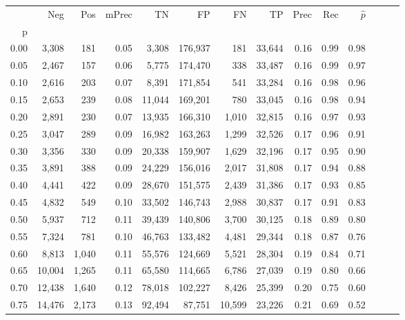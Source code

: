 \begin{tabular}{rrrrrrrrrrrrrr}
\toprule
{} &     Neg &    Pos & mPrec &       TN &       FP &      FN &      TP &  Prec &   Rec & $\hat{p}$ \\
p    &         &        &       &          &          &         &         &       &       &           \\
\midrule
0.00 &   3,308 &    181 &  0.05 &    3,308 &  176,937 &     181 &  33,644 &  0.16 &  0.99 &      0.98 \\
0.05 &   2,467 &    157 &  0.06 &    5,775 &  174,470 &     338 &  33,487 &  0.16 &  0.99 &      0.97 \\
0.10 &   2,616 &    203 &  0.07 &    8,391 &  171,854 &     541 &  33,284 &  0.16 &  0.98 &      0.96 \\
0.15 &   2,653 &    239 &  0.08 &   11,044 &  169,201 &     780 &  33,045 &  0.16 &  0.98 &      0.94 \\
0.20 &   2,891 &    230 &  0.07 &   13,935 &  166,310 &   1,010 &  32,815 &  0.16 &  0.97 &      0.93 \\
0.25 &   3,047 &    289 &  0.09 &   16,982 &  163,263 &   1,299 &  32,526 &  0.17 &  0.96 &      0.91 \\
0.30 &   3,356 &    330 &  0.09 &   20,338 &  159,907 &   1,629 &  32,196 &  0.17 &  0.95 &      0.90 \\
0.35 &   3,891 &    388 &  0.09 &   24,229 &  156,016 &   2,017 &  31,808 &  0.17 &  0.94 &      0.88 \\
0.40 &   4,441 &    422 &  0.09 &   28,670 &  151,575 &   2,439 &  31,386 &  0.17 &  0.93 &      0.85 \\
0.45 &   4,832 &    549 &  0.10 &   33,502 &  146,743 &   2,988 &  30,837 &  0.17 &  0.91 &      0.83 \\
0.50 &   5,937 &    712 &  0.11 &   39,439 &  140,806 &   3,700 &  30,125 &  0.18 &  0.89 &      0.80 \\
0.55 &   7,324 &    781 &  0.10 &   46,763 &  133,482 &   4,481 &  29,344 &  0.18 &  0.87 &      0.76 \\
0.60 &   8,813 &  1,040 &  0.11 &   55,576 &  124,669 &   5,521 &  28,304 &  0.19 &  0.84 &      0.71 \\
0.65 &  10,004 &  1,265 &  0.11 &   65,580 &  114,665 &   6,786 &  27,039 &  0.19 &  0.80 &      0.66 \\
0.70 &  12,438 &  1,640 &  0.12 &   78,018 &  102,227 &   8,426 &  25,399 &  0.20 &  0.75 &      0.60 \\
0.75 &  14,476 &  2,173 &  0.13 &   92,494 &   87,751 &  10,599 &  23,226 &  0.21 &  0.69 &      0.52 \\

\end{tabular}
